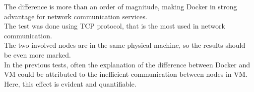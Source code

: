 The difference is more than an order of magnitude,
making Docker in strong advantage for network communication services. \\
The test was done using TCP protocol, that is the most used in network communication. \\
The two involved nodes are in the same physical machine, so the results should be even more marked. \\
In the previous tests, often the explanation of the difference between Docker and VM could be attributed to the inefficient communication between nodes in VM. \\
Here, this effect is evident and quantifiable.
